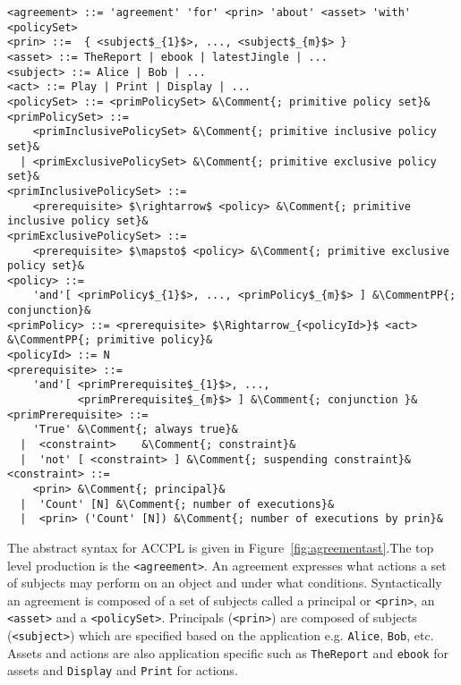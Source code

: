 \documentclass[conference]{IEEEtran}
\newcommand{\syn}{\texttt}
\begin{document}
\lstset{mathescape, captionpos=b, language=AST, escapechar=\&} 
\begin{figure*}
\begin{lstlisting}
<agreement> ::= 'agreement' 'for' <prin> 'about' <asset> 'with' <policySet> 
<prin> ::=  { <subject$_{1}$>, ..., <subject$_{m}$> }
<asset> ::= TheReport | ebook | latestJingle | ...
<subject> ::= Alice | Bob | ...
<act> ::= Play | Print | Display | ...
<policySet> ::= <primPolicySet> &\Comment{; primitive policy set}&
<primPolicySet> ::=
    <primInclusivePolicySet> &\Comment{; primitive inclusive policy set}&
  | <primExclusivePolicySet> &\Comment{; primitive exclusive policy set}&
<primInclusivePolicySet> ::=  
    <prerequisite> $\rightarrow$ <policy> &\Comment{; primitive inclusive policy set}&
<primExclusivePolicySet> ::=
    <prerequisite> $\mapsto$ <policy> &\Comment{; primitive exclusive policy set}&
<policy> ::=  
    'and'[ <primPolicy$_{1}$>, ..., <primPolicy$_{m}$> ] &\CommentPP{; conjunction}&
<primPolicy> ::= <prerequisite> $\Rightarrow_{<policyId>}$ <act> &\CommentPP{; primitive policy}&
<policyId> ::= N 
<prerequisite> ::=    
    'and'[ <primPrerequisite$_{1}$>, ..., 
           <primPrerequisite$_{m}$> ] &\Comment{; conjunction }&
<primPrerequisite> ::=  
    'True' &\Comment{; always true}&
  |  <constraint>	 &\Comment{; constraint}&
  |  'not' [ <constraint> ] &\Comment{; suspending constraint}&    
<constraint> ::=  
    <prin> &\Comment{; principal}&
  |  'Count' [N] &\Comment{; number of executions}&
  |  <prin> ('Count' [N]) &\Comment{; number of executions by prin}&     
\end{lstlisting}
\caption{Abstract Syntax for ACCPL}
\label{fig:agreementast}
\end{figure*}

The abstract syntax for \ac{ACCPL} is given in Figure~\ref{fig:agreementast}.The top level production is the \syn{<agreement>}. An agreement expresses what actions a set of subjects may perform on an object and under what conditions. Syntactically an agreement is composed of a set of subjects called a principal or \syn{<prin>}, an \syn{<asset>} and a \syn{<policySet>}. Principals (\syn{<prin>}) are composed of subjects (\syn{<subject>}) which are specified based on the application e.g. \syn{Alice}, \syn{Bob}, etc. Assets and actions are also application specific such as \syn{TheReport} and \syn{ebook} for assets and \syn{Display} and \syn{Print} for actions. 
\end{document}
